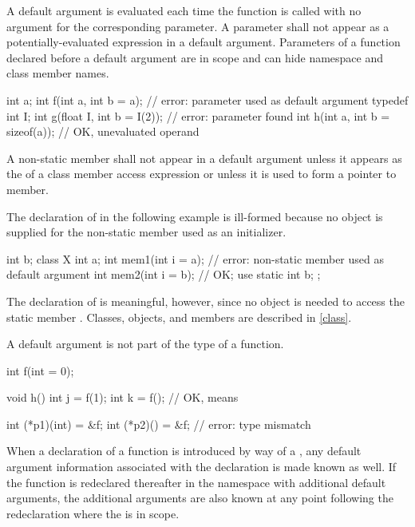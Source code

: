 \pnum
{}%
A default argument is evaluated each time the function is called
with no argument for the corresponding parameter.
%
A parameter shall not appear as a potentially-evaluated expression
in a default argument.
%
Parameters of a function declared before a default argument
are in scope and can hide namespace and class member names.
\begin{example}
\begin{codeblock}
int a;
int f(int a, int b = a);            // error: parameter  used as default argument
typedef int I;
int g(float I, int b = I(2));       // error: parameter  found
int h(int a, int b = sizeof(a));    // OK, unevaluated operand
\end{codeblock}
\end{example}
A non-static member shall not appear in a default argument unless it appears as
the  of a class member access expression or
unless it is used to form a pointer to member.
\begin{example}
The declaration of
in the following example is ill-formed because no object is supplied for the
non-static member
used as an initializer.
\begin{codeblock}
int b;
class X {
  int a;
  int mem1(int i = a);              // error: non-static member  used as default argument
  int mem2(int i = b);              // OK;  use 
  static int b;
};
\end{codeblock}
The declaration of
is meaningful, however, since no object is needed to access the static member
.
Classes, objects, and members are described in \ref{class}.
\end{example}
A default argument is not part of the
type of a function.
\begin{example}
\begin{codeblock}
int f(int = 0);

void h() {
  int j = f(1);
  int k = f();                      // OK, means 
}

int (*p1)(int) = &f;
int (*p2)() = &f;                   // error: type mismatch
\end{codeblock}
\end{example}
When a declaration of a function is introduced by way of a
,
any default argument information associated
with the declaration is made known as well.
If the function is redeclared
thereafter in the namespace with additional default arguments,
the additional arguments are also known at any point following
the redeclaration where the
is in scope.

